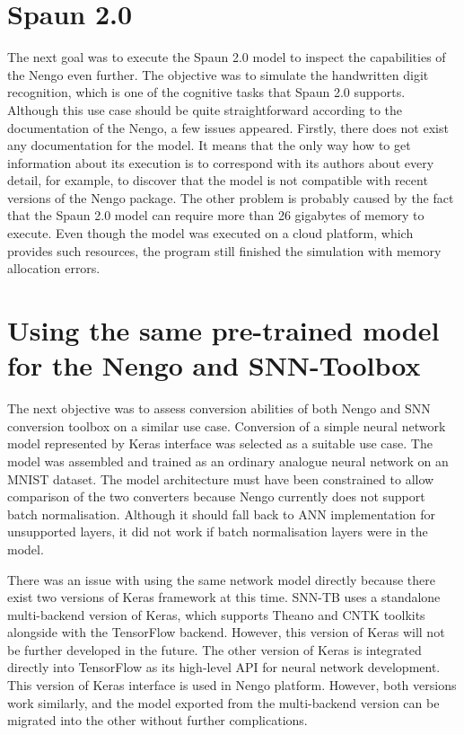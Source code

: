 \section{Spaun 2.0}
The next goal was to execute the Spaun 2.0 model to inspect the capabilities of the Nengo even further. The objective was to simulate the handwritten digit recognition, which is one of the cognitive tasks that Spaun 2.0 supports. Although this use case should be quite straightforward according to the documentation of the Nengo, a few issues appeared. Firstly, there does not exist any documentation for the model. It means that the only way how to get information about its execution is to correspond with its authors about every detail, for example, to discover that the model is not compatible with recent versions of the Nengo package. The other problem is probably caused by the fact that the Spaun 2.0 model can require more than 26 gigabytes of memory to execute. Even though the model was executed on a cloud platform, which provides such resources, the program still finished the simulation with memory allocation errors.

\section{Using the same pre-trained model for the Nengo and SNN-Toolbox}
The next objective was to assess conversion abilities of both Nengo and SNN conversion toolbox on a similar use case. Conversion of a simple neural network model represented by Keras interface was selected as a suitable use case. The model was assembled and trained as an ordinary analogue neural network on an MNIST dataset. The model architecture must have been constrained to allow comparison of the two converters because Nengo currently does not support batch normalisation. Although it should fall back to ANN implementation for unsupported layers, it did not work if batch normalisation layers were in the model.\par
There was an issue with using the same network model directly because there exist two versions of Keras framework at this time. SNN-TB uses a standalone multi-backend version of Keras, which supports Theano and CNTK toolkits alongside with the TensorFlow backend. However, this version of Keras will not be further developed in the future. The other version of Keras is integrated directly into TensorFlow as its high-level API for neural network development. This version of Keras interface is used in Nengo platform. However, both versions work similarly, and the model exported from the multi-backend version can be migrated into the other without further complications.

